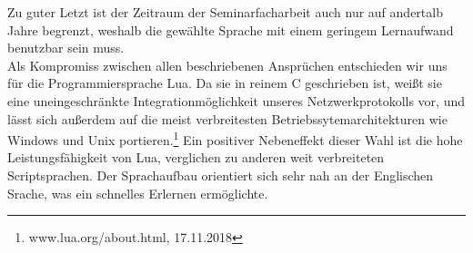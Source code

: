 \documentclass[12pt, a4paper]{scrartcl}
\begin{document}
Zu guter Letzt ist der Zeitraum der Seminarfacharbeit auch nur auf andertalb Jahre begrenzt, weshalb die gewählte Sprache mit einem geringem Lernaufwand benutzbar sein muss.\\
Als Kompromiss zwischen allen beschriebenen Ansprüchen entschieden wir uns für die Programmiersprache Lua. Da sie in reinem C geschrieben ist, weißt sie eine uneingeschränkte Integrationmöglichkeit unseres Netzwerkprotokolls vor, und lässt sich außerdem auf die meist verbreitesten Betriebssytemarchitekturen wie Windows und Unix portieren.\footnote{www.lua.org/about.html, 17.11.2018} Ein positiver Nebeneffekt dieser Wahl ist die hohe Leistungsfähigkeit von Lua, verglichen zu anderen weit verbreiteten Scriptsprachen. Der Sprachaufbau orientiert sich sehr nah an der Englischen Srache, was ein schnelles Erlernen ermöglichte. 
\end{document}

